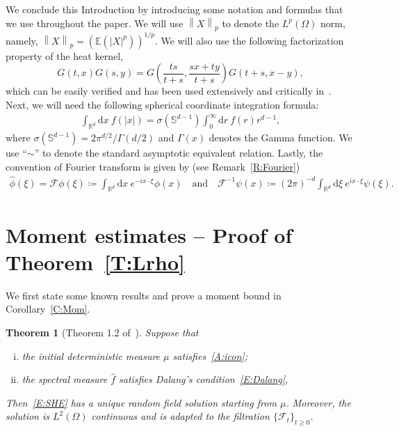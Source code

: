 \documentclass[sn-mathphys]{sn-jnl}%
\renewcommand{\R}{\mathbb{R}}
\newcommand{\Norm}[1]{\left\| #1 \right\|}
\newcommand{\ud}{\ensuremath{\mathrm{d}}}
\numberwithin{equation}{section}
\theoremstyle{thmstyleone}%
\newtheorem{theorem}{Theorem}[section]%
\theoremstyle{thmstyletwo}%
\theoremstyle{thmstylethree}%
\begin{document}
\bigskip

We conclude this Introduction by introducing some notation and formulas that we use throughout the
paper. We will use $\Norm{X}_p$ to denote the $L^p (\Omega)$ norm, namely,
$\Norm{X}_p = \left(\mathbb{E}(\lvert X \rvert^p)\right)^{1/p}$. We will also use the following factorization
property of the heat kernel,
\begin{equation}\label{E:gsim}
  G(t,x)G(s,y) = G\left(\frac{ts}{t+s}, \frac{sx + ty}{t+s}\right)G\left(t+s, x-y\right),
\end{equation}
which can be easily verified and has been used extensively and critically
in~\cite{chen.dalang:15:moments*1, chen.kim:19:nonlinear, chen.huang:19:comparison}. Next, we will
need the following spherical coordinate integration formula:
\begin{align*}
  \int_{\R^d} \ud x \: f(\lvert x \rvert) = \sigma(\mathbb{S}^{d-1}) \int_0^\infty \ud r\: f(r) r^{d-1},
\end{align*}
where $\sigma(\mathbb{S}^{d-1}) = 2\pi^{d/2} / \Gamma(d/2)$ and $\Gamma(x)$ denotes the Gamma
function. We use ``$\sim$'' to denote the standard asymptotic equivalent relation. Lastly, the
convention of Fourier transform is given by (see Remark~\ref{R:Fourier})
\begin{align}\label{E:Fourier}
  \widehat{\phi}(\xi) = \mathcal{F}\phi(\xi) \coloneqq \int_{\R^d} \ud x\: e^{-i x\cdot\xi} \phi(x) \quad \text{and} \quad
  \mathcal{F}^{-1}\psi(x) \coloneqq (2\pi)^{-d} \int_{\R^d} \ud \xi\: e^{i x\cdot\xi} \psi(\xi).
\end{align}


\section{Moment estimates -- Proof of Theorem~\ref{T:Lrho}}\label{S:Lrho}
We first state some known results and prove a moment bound in Corollary~\ref{C:Mom}.

\begin{theorem}[Theorem 1.2 of~\cite{chen.huang:19:comparison}]\label{T:Solve}
  Suppose that
  \begin{enumerate}[(i)]
   \item the initial deterministic measure $\mu$ satisfies~\eqref{A:icon};
   \item the spectral measure $\widehat{f}$ satisfies \textit{Dalang's condition}~\eqref{E:Dalang},
  \end{enumerate}
  Then~\eqref{E:SHE} has a unique random field solution starting from $\mu$. Moreover, the solution
  is $L^2 (\Omega)$ continuous and is adapted to the filtration $\{\mathcal{F}_t\}_{t\ge 0}$.
\end{theorem}
\end{document}
